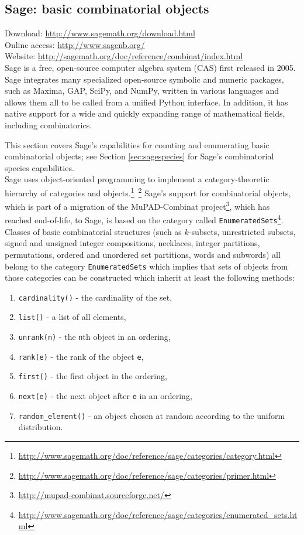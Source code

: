 \documentclass[12pt]{article}
\theoremstyle{plain}
\newcommand{\codefont}[1]{{\fontshape{n}\texttt{#1}}}
\begin{document}
\subsection{Sage: basic combinatorial objects}

Download: \url{http://www.sagemath.org/download.html}
\\
Online access: \url{http://www.sagenb.org/}
\\
Website: \url{http://sagemath.org/doc/reference/combinat/index.html}
\\

Sage is a free, open-source computer algebra system (CAS) first released in 2005.
Sage integrates many specialized open-source symbolic and numeric packages, such as Maxima, GAP, SciPy, and NumPy, written in various languages and allows them all to be called from a unified Python interface.
In addition, it has native support for a wide and quickly expanding range of mathematical fields, including combinatorics.

This section covers Sage's capabilities for counting and enumerating basic combinatorial objects;
see
Section \ref{sec:sagespecies}
for Sage's combinatorial species capabilities.
\\

Sage uses object-oriented programming to implement a category-theoretic hierarchy of categories and objects.\footnote{
 \url{http://www.sagemath.org/doc/reference/sage/categories/category.html}
}\ \footnote{
 \url{http://www.sagemath.org/doc/reference/sage/categories/primer.html}
}
Sage's support for combinatorial objects, which is part of a migration of the MuPAD-Combinat project\footnote{
 \url{http://mupad-combinat.sourceforge.net/}
}, which has reached end-of-life, to Sage, is based on the category called \codefont{EnumeratedSets}\footnote{
 \url{http://www.sagemath.org/doc/reference/sage/categories/enumerated\_sets.html}
}.
Classes of basic combinatorial structures
(such as \(k\)-subsets, unrestricted subsets, signed and unsigned integer compositions, necklaces,
integer partitions, permutations, ordered and unordered set partitions, words and subwords)
all belong to the category \codefont{EnumeratedSets} which implies that
sets of objects from those categories can be constructed which
inherit at least the following methods:
\begin{enumerate}
 \item \codefont{cardinality()} - the cardinality of the set,
 \item \codefont{list()} - a list of all elements,
 \item \codefont{unrank(n)} - the \codefont{n}th object in an ordering,
 \item \codefont{rank(e)} - the rank of the object \codefont{e},
 \item \codefont{first()} - the first object in the ordering,
 \item \codefont{next(e)} - the next object after \codefont{e} in an ordering,
 \item \codefont{random\_element()} - an object chosen at random according to the uniform distribution.
\end{enumerate}
\end{document}
